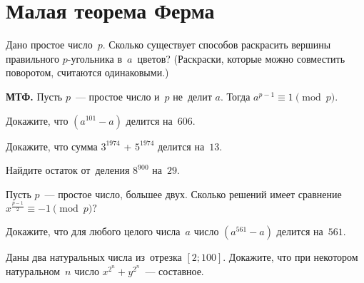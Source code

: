 
\section*{Малая теорема Ферма}



\begin{problems}

\item
Дано простое число~$p$.
Сколько существует способов раскрасить вершины правильного $p$-угольника
в~$a$~цветов?
(Раскраски, которые можно совместить поворотом, считаются одинаковыми.)

\item\textbf{МТФ.}
Пусть $p$~--- простое число и~$p$ не~делит $a$.
Тогда  $a^{p-1} \equiv 1 \pmod p$.

\item
Докажите, что $(a^{101} - a)$ делится на~$606$.

\item
Докажите, что сумма $3^{1974}$ + $5^{1974}$ делится на~$13$.

\item
Найдите остаток от~деления $8^{900}$ на~$29$.

\item
Пусть $p$~--- простое число, большее двух.
Сколько решений имеет сравнение $x^{\frac{p-1}{2}} \equiv - 1 \pmod{p}?$

\item
Докажите, что для любого целого числа~$a$ число $(a^{561} - a)$ делится
на~$561$.

\item
Даны два натуральных числа из~отрезка $[2; 100]$.
Докажите, что при некотором натуральном~$n$ число $x^{2^n} + y^{2^n}$~---
составное.

\end{problems}

